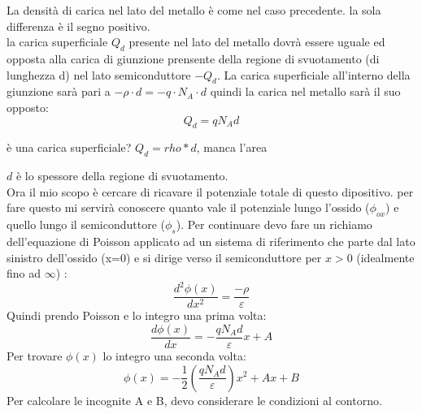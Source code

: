 La densità di carica nel lato del metallo è come nel caso precedente. la sola differenza è il segno positivo.\\
la carica superficiale $Q_d$ presente nel lato del metallo dovrà essere uguale ed opposta alla carica di giunzione prensente della regione di svuotamento (di lunghezza d) nel lato semiconduttore $-Q_d$.
La carica superficiale all'interno della giunzione sarà pari a $-\rho \cdot d = -q\cdot N_A \cdot d$ quindi la carica nel metallo sarà il suo opposto:
\begin{equation}
    Q_d=q N_A d
\end{equation}
\begin{ricevimento}
    è una carica superficiale? $Q_d=rho *d$, manca l'area
\end{ricevimento}
$d$ è lo spessore della regione di svuotamento.\\
Ora il mio scopo è cercare di ricavare il potenziale totale di questo dipositivo. per fare questo mi servirà conoscere quanto vale il potenziale lungo l'ossido ($\phi_{ox}$) e quello lungo il semiconduttore ($\phi_{s}$). Per continuare devo fare un richiamo dell'equazione di Poisson applicato ad un sistema di riferimento che parte dal lato sinistro dell'ossido (x=0) e si dirige verso il semiconduttore per $x>0$ (idealmente fino ad $\infty$) :
%
\begin{equation}
    \dfrac{d^2\phi(x)}{dx^2}=\dfrac{-\rho}{\varepsilon}
\end{equation}
%
Quindi prendo Poisson e lo integro una prima volta:
%
\begin{equation}
    \dfrac{d \phi(x)}{dx}=-\dfrac{qN_Ad}{\varepsilon}x +A
\end{equation}
%
Per trovare $\phi(x)$ lo integro una seconda volta:
%
\begin{equation}
    \phi(x)=-\dfrac{1}{2}\left(\dfrac{qN_Ad}{\varepsilon}\right)x^2 +Ax + B
\end{equation}
%
Per calcolare le incognite A e B, devo considerare le condizioni al contorno.
%
